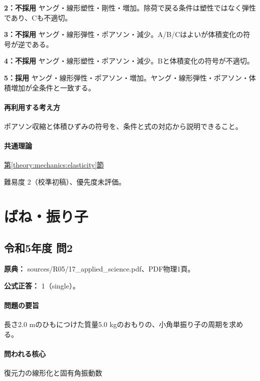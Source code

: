 \noindent\textbf{2：不採用} ヤング・線形塑性・剛性・増加。除荷で戻る条件は塑性ではなく弾性であり、Cも不適切。\par

\noindent\textbf{3：不採用} ヤング・線形弾性・ポアソン・減少。A/B/Cはよいが体積変化の符号が逆である。\par

\noindent\textbf{4：不採用} ヤング・線形塑性・ポアソン・減少。Bと体積変化の符号が不適切。\par

\noindent\textbf{5：採用} ヤング・線形弾性・ポアソン・増加。ヤング・線形弾性・ポアソン・体積増加が全条件と一致する。\par

\paragraph{再利用する考え方} ポアソン収縮と体積ひずみの符号を、条件と式の対応から説明できること。

\paragraph{共通理論} \hyperref[theory:mechanics:elasticity]{第\ref*{theory:mechanics:elasticity}節}

\par 難易度 2（校準初稿）、優先度未評価。

\section{ばね・振り子}

\subsection{令和5年度 問2}
\label{q:r05-reg-applied-02}

\noindent\textbf{原典：} sources/R05/17\_applied\_science.pdf、PDF物理1頁。

\textbf{公式正答：} 1（single）。

\paragraph{問題の要旨} 長さ2.0 mのひもにつけた質量5.0 kgのおもりの、小角単振り子の周期を求める。

\paragraph{問われる核心} 復元力の線形化と固有角振動数

